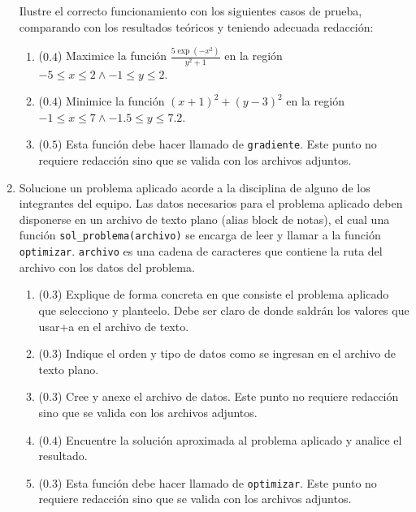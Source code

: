 \documentclass[12pt]{article}
\begin{document}
\begin{enumerate}[leftmargin=*,widest=9]
    Ilustre el correcto funcionamiento con los siguientes casos de prueba, comparando con los resultados teóricos y teniendo adecuada redacción:

   \begin{enumerate}[label=\alph*]
    \item ($0.4$) Maximice la función {\large \(\frac{5\exp(-x^2)}{y^2+1}\)} en la región \(-5\leq x \leq 2 \wedge -1 \leq y \leq 2\).
    \item ($0.4$) Minimice la función \((x+1)^2 + (y-3)^2\) en la región \(-1\leq x \leq 7 \wedge -1.5 \leq y \leq 7.2\).
    \item ($0.5$) Esta función debe hacer llamado de \verb-gradiente-. Este punto no requiere redacción sino que se valida con los archivos adjuntos.
   \end{enumerate}

\item Solucione un problema aplicado acorde a la disciplina de alguno de los integrantes del equipo. Las datos necesarios para el problema aplicado deben disponerse en un archivo de texto plano (alias block de notas), el cual una función \verb-sol_problema(archivo)- se encarga de leer y llamar a la función \verb-optimizar-. \verb-archivo- es una cadena de caracteres que contiene la ruta del archivo con los datos del problema.

    \begin{enumerate}[label=\alph*]
    \item ($0.3$) Explique de forma concreta en que consiste el problema aplicado que selecciono y planteelo. Debe ser claro de donde saldrán los valores que usar+a en el archivo de texto.
    \item ($0.3$) Indique el orden y tipo de datos como se ingresan en el archivo de texto plano.
    \item ($0.3$) Cree y anexe el archivo de datos. Este punto no requiere redacción sino que se valida con los archivos adjuntos.
    \item ($0.4$) Encuentre la solución aproximada al problema aplicado y analice el resultado.
    \item ($0.3$) Esta función debe hacer llamado de \verb-optimizar-. Este punto no requiere redacción sino que se valida con los archivos adjuntos.
   \end{enumerate}

\end{enumerate}
\end{document}
